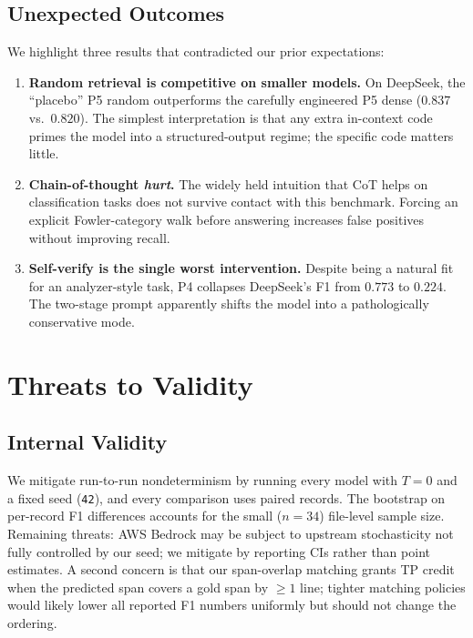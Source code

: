 \documentclass[conference]{IEEEtran}
\begin{document}
\subsection{Unexpected Outcomes}
We highlight three results that contradicted our prior expectations:
\begin{enumerate}
 \item \textbf{Random retrieval is competitive on smaller models.} On
 DeepSeek, the ``placebo'' P5 random outperforms the carefully engineered
 P5 dense ($0.837$ vs.\ $0.820$). The simplest interpretation is that any
 extra in-context code primes the model into a structured-output regime;
 the specific code matters little.
 \item \textbf{Chain-of-thought \emph{hurt}.} The widely held intuition
 that CoT helps on classification tasks does not survive contact with this
 benchmark. Forcing an explicit Fowler-category walk before answering
 increases false positives without improving recall.
 \item \textbf{Self-verify is the single worst intervention.} Despite being
 a natural fit for an analyzer-style task, P4 collapses DeepSeek's F1 from
 $0.773$ to $0.224$. The two-stage prompt apparently shifts the model into
 a pathologically conservative mode.
\end{enumerate}

\section{Threats to Validity}
\label{sec:threats}

\subsection{Internal Validity}
We mitigate run-to-run nondeterminism by running every model with $T{=}0$ and
a fixed seed (\texttt{42}), and every comparison uses paired records. The
bootstrap on per-record F1 differences accounts for the small ($n{=}34$)
file-level sample size. Remaining threats: AWS Bedrock may be subject to
upstream stochasticity not fully controlled by our seed; we mitigate by
reporting CIs rather than point estimates. A second concern is that our
span-overlap matching grants TP credit when the predicted span covers a gold
span by $\ge 1$ line; tighter matching policies would likely lower all
reported F1 numbers uniformly but should not change the ordering.
\end{document}
